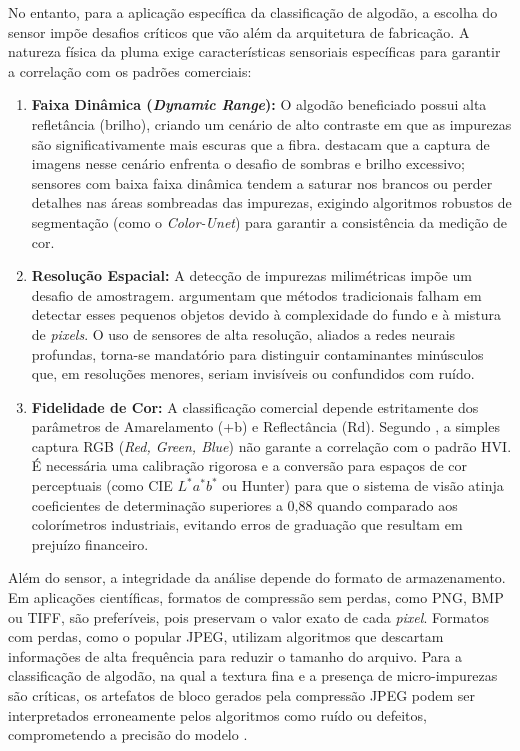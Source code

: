         

        No entanto, para a aplicação específica da classificação de algodão, a escolha do sensor impõe desafios críticos que vão além da arquitetura de fabricação. A natureza física da pluma exige características sensoriais específicas para garantir a correlação com os padrões comerciais:

    \begin{enumerate}
        \item \textbf{Faixa Dinâmica (\textit{Dynamic Range}):} O algodão beneficiado possui alta refletância (brilho), criando um cenário de alto contraste em que as impurezas são significativamente mais escuras que a fibra.  destacam que a captura de imagens nesse cenário enfrenta o desafio de sombras e brilho excessivo; sensores com baixa faixa dinâmica tendem a saturar nos brancos ou perder detalhes nas áreas sombreadas das impurezas, exigindo algoritmos robustos de segmentação (como o \textit{Color-Unet}) para garantir a consistência da medição de cor.
        
        \item \textbf{Resolução Espacial:} A detecção de impurezas milimétricas impõe um desafio de amostragem.  argumentam que métodos tradicionais falham em detectar esses pequenos objetos devido à complexidade do fundo e à mistura de \textit{pixels}. O uso de sensores de alta resolução, aliados a redes neurais profundas, torna-se mandatório para distinguir contaminantes minúsculos que, em resoluções menores, seriam invisíveis ou confundidos com ruído.
        
        \item \textbf{Fidelidade de Cor:} A classificação comercial depende estritamente dos parâmetros de Amarelamento (+b) e Reflectância (Rd). Segundo , a simples captura RGB (\textit{Red, Green, Blue}) não garante a correlação com o padrão HVI. É necessária uma calibração rigorosa e a conversão para espaços de cor perceptuais (como CIE $L^*a^*b^*$ ou Hunter) para que o sistema de visão atinja coeficientes de determinação superiores a 0,88 quando comparado aos colorímetros industriais, evitando erros de graduação que resultam em prejuízo financeiro.
    \end{enumerate}


        Além do sensor, a integridade da análise depende do formato de armazenamento. Em aplicações científicas, formatos de compressão sem perdas, como PNG, BMP ou TIFF, são preferíveis, pois preservam o valor exato de cada \textit{pixel}. Formatos com perdas, como o popular JPEG, utilizam algoritmos que descartam informações de alta frequência para reduzir o tamanho do arquivo. Para a classificação de algodão, na qual a textura fina e a presença de micro-impurezas são críticas, os artefatos de bloco gerados pela compressão JPEG podem ser interpretados erroneamente pelos algoritmos como ruído ou defeitos, comprometendo a precisão do modelo \cite{vanderwalt2014scikit}.


